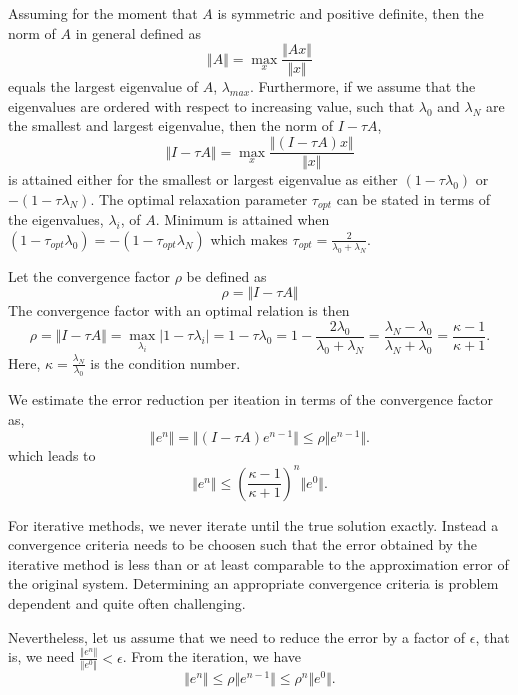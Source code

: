 Assuming for the moment that $A$ is symmetric and positive definite, then  
the norm of $A$ in general defined as 
\[
\Vert A\Vert = \max_x \frac{\Vert Ax \Vert}{\Vert x \Vert} 
\]
equals the largest eigenvalue of $A$, $\lambda_{max}$.   
Furthermore, if we assume that the eigenvalues are ordered with respect to increasing value,
such that  $\lambda_0$ and $\lambda_N$ are the smallest and largest eigenvalue, then the
norm of $I - \tau A $, 
\[
\Vert I - \tau A\Vert = \max_x \frac{\Vert (I - \tau A) x \Vert}{\Vert x \Vert} 
\]
is attained either for the smallest or largest eigenvalue as either   
$(1 - \tau \lambda_0)$ or  $-(1 - \tau \lambda_N)$.  
The optimal relaxation parameter $\tau_{opt}$ can be stated in terms of the eigenvalues,    $\lambda_i$,  of $A$. 
Minimum is attained
when $(1 - \tau_{opt} \lambda_0) = -(1 - \tau_{opt} \lambda_N)$ which makes   
$\tau_{opt} = \frac{2}{\lambda_0 + \lambda_N}$.

Let the convergence factor $\rho$ be defined as 
\[
\rho = \Vert I - \tau A\Vert 
\]
The convergence factor with an optimal relation is then 
\[
\rho = \Vert I - \tau A\Vert = \max_{\lambda_i}\vert 1- \tau \lambda_i\vert  = 
1 - \tau\lambda_0 = 1 - \frac{2\lambda_0}{\lambda_0 + \lambda_N} = 
\frac{\lambda_N - \lambda_0}{\lambda_N + \lambda_0} = \frac{\kappa - 1}{\kappa + 1}.
\]  
Here, $\kappa=\frac{\lambda_N}{\lambda_0}$ is the condition number. 

We estimate the error reduction per iteation in terms of the convergence factor as, 
\[
\Vert e^n \Vert = \Vert (I - \tau A) e^{n-1} \Vert \le  \rho \Vert e^{n-1}\Vert .  
\]
which leads to
\[
\Vert e^n \Vert \le (\frac{\kappa - 1}{\kappa + 1})^n\Vert e^0\Vert. 
\]


For iterative methods, we never iterate until the true solution exactly. Instead a convergence 
criteria needs to be choosen such that the error obtained by the iterative method is
less than or at least comparable to the approximation error of the original system.      
Determining an appropriate convergence criteria is problem dependent and quite often 
challenging. 

Nevertheless, let us assume  that we need to reduce the error by a factor of $\epsilon$, 
that is, we need $\frac{\Vert e^n\Vert}{\Vert e^0 \Vert} < \epsilon$. From the iteration, we have 
\begin{equation}
\label{eq:convergence}
\Vert e^n \Vert \le \rho \Vert e^{n-1} \Vert \le \rho^n \Vert e^0 \Vert.
\end{equation}

